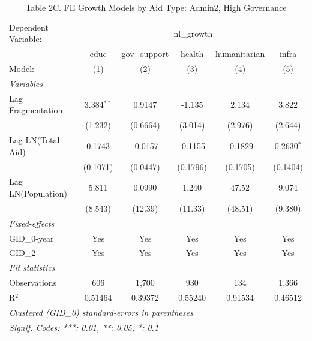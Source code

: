 \begin{table}[htbp]
   \caption{Table 2C. FE Growth Models by Aid Type: Admin2, High Governance}
   \centering
   \begin{tabular}{lccccc}
      \tabularnewline \midrule \midrule
      Dependent Variable: & \multicolumn{5}{c}{nl\_growth}\\
                         & educ         & gov\_support  & health   & humanitarian & infra \\   
      Model:             & (1)          & (2)           & (3)      & (4)          & (5)\\  
      \midrule
      \emph{Variables}\\
      Lag Fragmentation  & 3.384$^{**}$ & 0.9147        & -1.135   & 2.134        & 3.822\\   
                         & (1.232)      & (0.6664)      & (3.014)  & (2.976)      & (2.644)\\   
      Lag LN(Total Aid)  & 0.1743       & -0.0157       & -0.1155  & -0.1829      & 0.2630$^{*}$\\   
                         & (0.1071)     & (0.0447)      & (0.1796) & (0.1705)     & (0.1404)\\   
      Lag LN(Population) & 5.811        & 0.0990        & 1.240    & 47.52        & 9.074\\   
                         & (8.543)      & (12.39)       & (11.33)  & (48.51)      & (9.380)\\   
      \midrule
      \emph{Fixed-effects}\\
      GID\_0-year        & Yes          & Yes           & Yes      & Yes          & Yes\\  
      GID\_2             & Yes          & Yes           & Yes      & Yes          & Yes\\  
      \midrule
      \emph{Fit statistics}\\
      Observations       & 606          & 1,700         & 930      & 134          & 1,366\\  
      R$^2$              & 0.51464      & 0.39372       & 0.55240  & 0.91534      & 0.46512\\  
      \midrule \midrule
      \multicolumn{6}{l}{\emph{Clustered (GID\_0) standard-errors in parentheses}}\\
      \multicolumn{6}{l}{\emph{Signif. Codes: ***: 0.01, **: 0.05, *: 0.1}}\\
   \end{tabular}
\end{table}



